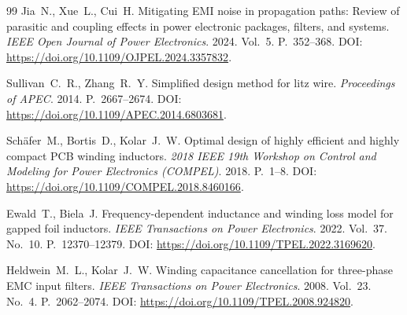 \documentclass[14pt,a4paper]{extarticle}
\begin{document}
\begin{thebibliography}{99}
Jia~N., Xue~L., Cui~H.
Mitigating EMI noise in propagation paths: Review of parasitic and coupling
effects in power electronic packages, filters, and systems.
\textit{IEEE Open Journal of Power Electronics}. 2024. Vol.~5.
P.~352--368.
DOI: \url{https://doi.org/10.1109/OJPEL.2024.3357832}.

Sullivan~C.~R., Zhang~R.~Y.
Simplified design method for litz wire.
\textit{Proceedings of APEC}. 2014. P.~2667--2674.
DOI: \url{https://doi.org/10.1109/APEC.2014.6803681}.

Schäfer~M., Bortis~D., Kolar~J.~W.
Optimal design of highly efficient and highly compact PCB winding
inductors.
\textit{2018 IEEE 19th Workshop on Control and Modeling for Power
Electronics (COMPEL)}. 2018. P.~1--8.
DOI: \url{https://doi.org/10.1109/COMPEL.2018.8460166}.

Ewald~T., Biela~J.
Frequency-dependent inductance and winding loss model for gapped foil
inductors.
\textit{IEEE Transactions on Power Electronics}. 2022. Vol.~37. No.~10.
P.~12370--12379.
DOI: \url{https://doi.org/10.1109/TPEL.2022.3169620}.

Heldwein~M.~L., Kolar~J.~W.
Winding capacitance cancellation for three-phase EMC input filters.
\textit{IEEE Transactions on Power Electronics}. 2008. Vol.~23. No.~4.
P.~2062--2074.
DOI: \url{https://doi.org/10.1109/TPEL.2008.924820}.

\end{thebibliography}
\end{document}
